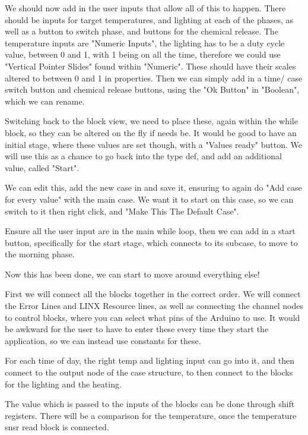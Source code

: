 \documentclass[a4paper,11pt]{report}
\begin{document}
We should now add in the user inputs that allow all of this to happen. There should be inputs for target temperatures, and lighting at each of the phases, as well as a button to switch phase, and buttons for the chemical release.
The temperature inputs are "Numeric Inputs", the lighting has to be a duty cycle value, between 0 and 1, with 1 being on all the time, therefore we could use "Vertical Pointer Slides" found within "Numeric". These should have their scales altered to between 0 and 1 in properties.
Then we can simply add in a time/ case switch button and chemical release buttons, using the "Ok Button" in "Boolean", which we can rename.

Switching back to the block view, we need to place these, again within the while block, so they can be altered on the fly if needs be. It would be good to have an initial stage, where these values are set though, with a "Values ready" button. We will use this as a chance to go back into the type def, and add an additional value, called "Start".

We can edit this, add the new case in and save it, ensuring to again do "Add case for every value" with the main case. We want it to start on this case, so we can switch to it then right click, and "Make This The Default Case".

Ensure all the user input are in the main while loop, then we can add in a start button, specifically for the start stage, which connects to its subcase, to move to the morning phase.

Now this has been done, we can start to move around everything else!

First we will connect all the blocks together in the correct order. We will connect the Error Lines and LINX Resource lines, as well as connecting the channel nodes to control blocks, where you can select what pins of the Arduino to use. It would be awkward for the user to have to enter these every time they start the application, so we can instead use constants for these.

For each time of day, the right temp and lighting input can go into it, and then connect to the output node of the case structure, to then connect to the blocks for the lighting and the heating.

The value which is passed to the inputs of the blocks can be done through shift registers. There will be a comparison for the temperature, once the temperature \gls{snsr} read block is connected.
\end{document}
